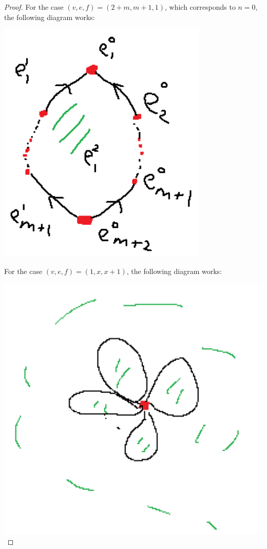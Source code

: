 \documentclass{article}
\begin{document}
\begin{proof}
For the case $(v,e,f)=(2+m,m+1,1)$, which corresponds to $n=0$, the following diagram works:

\includegraphics[scale=0.5]{Screenshot (1343).png}

For the case $(v,e,f)=(1,x,x+1)$, the following diagram works:

\includegraphics[scale=0.5]{Screenshot (1344).png}
\end{proof}
\end{document}

